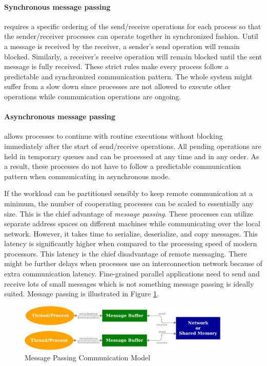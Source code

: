 \documentclass[11pt]{book}
\begin{document}
\paragraph{Synchronous message passing} requires a specific ordering of the send/receive operations
for each process so that the sender/receiver processes can operate together in synchronized fashion.  Until a
message is received by the receiver, a sender's send operation will remain blocked.  Similarly, a receiver's
receive operation will remain blocked until the sent message is fully received.  These strict rules make every
process follow a predictable and synchronized communication pattern.  The whole system might suffer from a
slow down since processes are not allowed to execute other operations while communication operations are
ongoing.

\paragraph{Asynchronous message passing} allows processes to continue with routine executions
without blocking immediately after the start of send/receive operations.  All pending operations are held in
temporary queues and can be processed at any time and in any order.  As a result, these processes do not have
to follow a predictable communication pattern when communicating in asynchronous mode.

If the workload can be partitioned sensibly to keep remote communication at a minimum, the number of
cooperating processes can be scaled to essentially any size.  This is the chief advantage of \emph{message
  passing}.  These processes can utilize separate address spaces on different machines while communicating
over the local network.  However, it takes time to serialize, deserialize, and copy messages.  This latency is
significantly higher when compared to the processing speed of modern processors.  This latency is the chief
disadvantage of remote messaging.  There might be further delays when processes use an interconnection network
because of extra communication latency.  Fine-grained parallel applications need to send and receive lots of
small messages which is not something message passing is ideally suited.  Message passing is illustrated
in Figure \ref{fig:message_passing}.

\begin{figure}
    \centering
    \includegraphics[width=0.9\textwidth]{figures/message_passing.pdf}
    \caption{Message Passing Communication Model}\label{fig:message_passing}
\end{figure}
\end{document}
